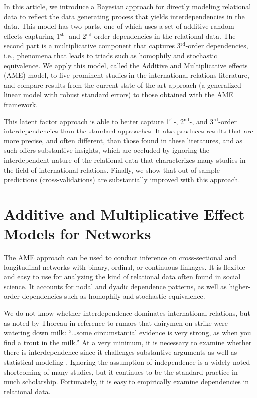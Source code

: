 \documentclass[12pt]{amsart}
\newcommand{\first}{1$^{\text{st}}$}
\newcommand{\second}{2$^{\text{nd}}$}
\newcommand{\third}{3$^{\text{rd}}$}
\begin{document}
In this article, we introduce a Bayesian approach for directly modeling relational data to reflect the data generating process that yields interdependencies in the data.  This model has two parts, one of which uses a set of additive random effects capturing \first- and \second-order dependencies in the relational data. The second part is a multiplicative component that captures \third-order dependencies, i.e., phenomena that leads to triads such as homophily and stochastic equivalence.  We apply this model, called the Additive and Multiplicative effects (AME) model, to five prominent studies in the international relations literature, and compare results from the current state-of-the-art approach (a generalized linear model with robust standard errors) to those obtained with the AME framework. 

This latent factor approach is able to better capture \first-, \second-, and \third-order interdependencies than the standard approaches. It also produces results that are more precise, and often different, than those found in these literatures, and as such offers substantive insights, which are occluded by ignoring the interdependent nature of the relational data that characterizes many studies in the field of international relations. Finally, we show that out-of-sample  predictions (cross-validations) are substantially improved with this approach.  

\section{\textbf{Additive and Multiplicative Effect Models for Networks}}

The AME approach can be used to conduct inference on cross-sectional and longitudinal networks with binary, ordinal, or continuous linkages. It is flexible and easy to use for analyzing the kind of relational data often found in social science.  It accounts for nodal and dyadic dependence patterns, as well as higher-order dependencies such as homophily and stochastic equivalence. 

We do not know whether interdependence dominates international relations, but as noted by Thoreau in reference to rumors that dairymen on strike were watering down milk: ``\ldots some circumstantial evidence is very strong, as when you find a trout in the milk.''  At a very minimum, it is necessary to examine whether there is interdependence since it challenges substantive arguments as well as statistical modeling \citep{snijders:2011}. Ignoring the assumption of independence is a widely-noted shortcoming of many studies, but it continues to be the standard practice in much scholarship. Fortunately, it is easy to empirically examine dependencies in relational data.
\end{document}

